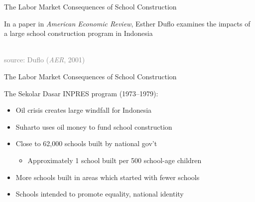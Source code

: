 \documentclass[10pt,xcolor=table,ignorenonframetext,handout,aspectratio=169]{beamer}
\newlength{\wideitemsep}
\let\olditem\item
\renewcommand{\item}{\setlength{\itemsep}{\wideitemsep}\olditem}
\begin{document}

\begin{frame}{The Labor Market Consequences of School Construction}

\medskip
In a paper in \emph{American Economic Review}, Esther Duflo examines the impacts of a large school construction program in Indonesia

\medskip
\medskip
\begin{center}
	
	 \\
	\textcolor{gray}{\tiny{source:  Duflo (\emph{AER}, 2001)}}
	
\end{center}

\end{frame}



\begin{frame}{The Labor Market Consequences of School Construction}

\medskip
The Sekolar Dasar INPRES program (1973--1979):

\medskip
\begin{itemize}
	
	\item Oil crisis creates large windfall for Indonesia
	
	\item Suharto uses oil money to fund school construction
	
	\item Close to 62,000 schools built by national gov't
	
	\medskip
	\begin{itemize}
		
		\item Approximately 1 school built per 500 school-age children
		
	\end{itemize}
	
	\item More schools built in areas which started with fewer schools
	
	\item Schools intended to promote equality, national identity
	
\end{itemize}

\end{frame}
\end{document}
